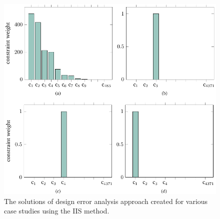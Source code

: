     
    
    
    
    
    
    
    
    
            
    
    
    
  
    
 
       \begin{figure}[ht]
    	\centering
    	\includegraphics[width=0.98\columnwidth]{figures/designError_analysis.pdf}
    	\caption{The solutions of design error analysis approach created for various case studies using the IIS method.}
    	\label{fig62}
    \end{figure}

